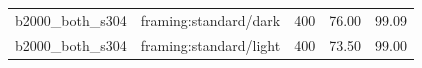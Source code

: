 \begin{longtable}{l>{\raggedright\arraybackslash}p{.42\linewidth}rrr}
b2000\_\allowbreak{}both\_\allowbreak{}s304 & %
framing:standard/dark & %
400 & %
76.00 & %
99.09 \\ %

b2000\_\allowbreak{}both\_\allowbreak{}s304 & %
framing:standard/light & %
400 & %
73.50 & %
99.00 \\ %


\end{longtable}
